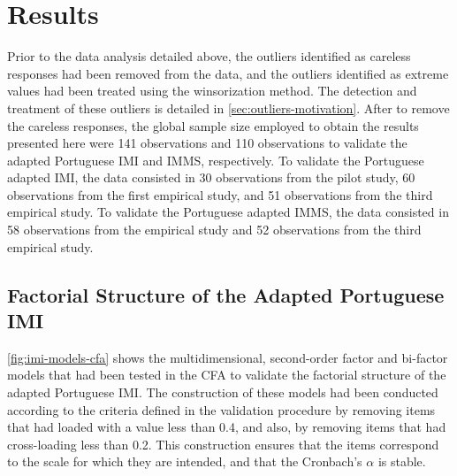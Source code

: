 \section{Results}
\label{sec:validation-motivation-surveys-results}

Prior to the data analysis detailed above, the outliers identified as careless responses had been removed from the data, and the outliers identified as extreme values had been treated using the winsorization method. The detection and treatment of these outliers is detailed in \autoref{sec:outliers-motivation}. After to remove the careless responses, the global sample size employed to obtain the results presented here were 141 observations and 110 observations to validate the adapted Portuguese IMI and IMMS, respectively. To validate the Portuguese adapted IMI, the data consisted in 30 observations from the pilot study, 60 observations from the first empirical study, and 51 observations from the third empirical study. To validate the Portuguese adapted IMMS, the data consisted in 58 observations from the empirical study and 52 observations from the third empirical study.

\subsection{Factorial Structure of the Adapted Portuguese IMI}

\autoref{fig:imi-models-cfa} shows the multidimensional, second-order factor and bi-factor models that had been tested in the CFA to validate the factorial structure of the adapted Portuguese IMI. The construction of these models had been conducted according to the criteria defined in the validation procedure by removing items that had loaded with a value less than 0.4, and also, by removing items that had cross-loading less than 0.2. This construction ensures that the items correspond to the scale for which they are intended, and that the Cronbach’s $\alpha$ is stable.

